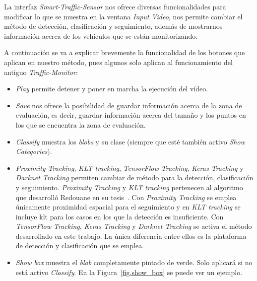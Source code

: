 La interfaz \textit{Smart-Traffic-Sensor} nos ofrece diversas funcionalidades para modificar lo que se muestra en la ventana \textit{Input Video}, nos permite cambiar el método de detección, clasificación y seguimiento, además de mostrarnos información acerca de los vehículos que se están monitorizando.

A continuación se va a explicar brevemente la funcionalidad de los botones que aplican en nuestro método, pues algunos solo aplican al funcionamiento del antiguo \textit{Traffic-Monitor}:
\begin{itemize}
    \item \textit{Play} permite detener y poner en marcha la ejecución del vídeo.
    \item \textit{Save} nos ofrece la posibilidad de guardar información acerca de la zona de evaluación, es decir, guardar información acerca del tamaño y los puntos en los que se encuentra la zona de evaluación.
    \item \textit{Classify} muestra los \textit{blobs} y su clase (siempre que esté también activo \textit{Show Categories}).
    \item \textit{Proximity Tracking}, \textit{KLT tracking}, \textit{TensorFlow Tracking}, \textit{Keras Tracking} y \textit{Darknet Tracking} permiten cambiar de método para la detección, clasificación y seguimiento. \textit{Proximity Tracking} y \textit{KLT tracking} pertenecen al algoritmo que desarrolló Redouane en su tesis~\cite{redo_tesis}. Con \textit{Proximity Tracking} se emplea únicamente proximidad espacial para el seguimiento y en \textit{KLT tracking} se incluye \acrshort{klt} para los casos en los que la detección es insuficiente. Con \textit{TensorFlow Tracking}, \textit{Keras Tracking} y \textit{Darknet Tracking} se activa el método desarrollado en este trabajo. La única diferencia entre ellos es la plataforma de detección y clasificación que se emplea.
    \item \textit{Show box} muestra el \textit{blob} completamente pintado de verde. Solo aplicará si no está activo \textit{Classify}. En la Figura~\ref{fig.show_box} se puede ver un ejemplo.
        \begin{figure}[H] 
    \begin{center}

\end{center}
\end{figure}
\end{itemize}
